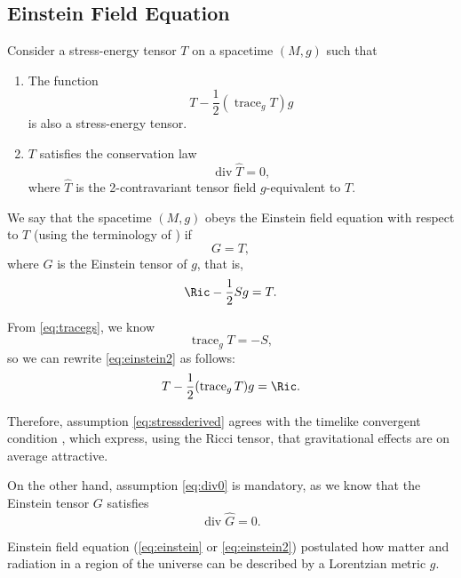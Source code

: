 \subsection{Einstein Field Equation}

Consider a stress-energy tensor $T$ on a spacetime $(M,g)$ such that
\begin{enumerate}
	\item The function \begin{equation}
	\label{eq:stressderived}
	T - \frac{1}{2}(\operatorname{trace}_g T) g
	\end{equation} is also a stress-energy tensor.
	\item $T$ satisfies the conservation law \begin{equation}
	\label{eq:div0}
	\operatorname{div} \widehat{T} = 0,
	\end{equation}
	where $\widehat{T}$ is the 2-contravariant tensor field $g$-equivalent to $T$.
\end{enumerate}

We say that the spacetime $(M,g)$ obeys the Einstein field equation with respect to $T$ (using the terminology of \cite[Sec. 6.2]{sachswu77}) if
\begin{equation}
\label{eq:einstein}
G  = T,
\end{equation}
where $G$ is the Einstein tensor of $g$, that is,
\begin{equation}
\label{eq:einstein2}
\Ric - \frac{1}{2}Sg = T.
\end{equation}

From \autoref{eq:tracegs}, we know
\[
\operatorname{trace}_g T = -S,
\]
so we can rewrite \autoref{eq:einstein2} as follows:
\begin{equation}
\label{eq:einstein3}
T - \frac{1}{2}(\operatorname{trace}_g T)g = \Ric.
\end{equation}

Therefore, assumption \ref{eq:stressderived} agrees with the timelike convergent condition \cite[p. 123]{sachs77}, which express, using the Ricci tensor, that gravitational effects are on average attractive.

On the other hand, assumption \ref{eq:div0} is mandatory, as we know that the Einstein tensor $G$ satisfies
\[
\operatorname{div} \hat{G} = 0.
\]

Einstein field equation (\autoref{eq:einstein} or \autoref{eq:einstein2}) postulated how matter and radiation in a region of the universe can be described by a Lorentzian metric $g$.

